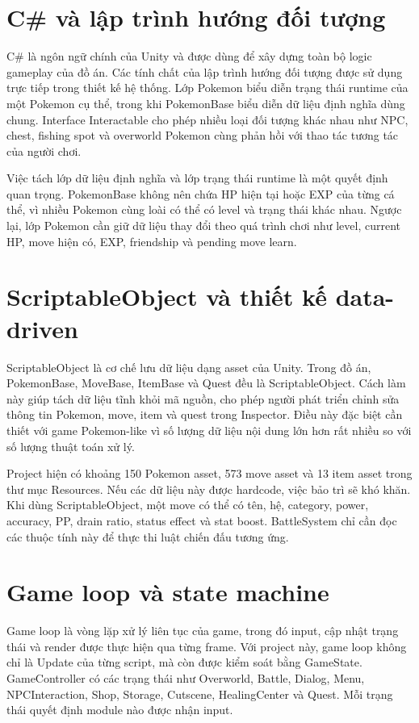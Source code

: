\section{C\# và lập trình hướng đối tượng}

C\# là ngôn ngữ chính của Unity và được dùng để xây dựng toàn bộ logic gameplay của đồ án. Các tính chất của lập trình hướng đối tượng được sử dụng trực tiếp trong thiết kế hệ thống. Lớp Pokemon biểu diễn trạng thái runtime của một Pokemon cụ thể, trong khi PokemonBase biểu diễn dữ liệu định nghĩa dùng chung. Interface Interactable cho phép nhiều loại đối tượng khác nhau như NPC, chest, fishing spot và overworld Pokemon cùng phản hồi với thao tác tương tác của người chơi.

Việc tách lớp dữ liệu định nghĩa và lớp trạng thái runtime là một quyết định quan trọng. PokemonBase không nên chứa HP hiện tại hoặc EXP của từng cá thể, vì nhiều Pokemon cùng loài có thể có level và trạng thái khác nhau. Ngược lại, lớp Pokemon cần giữ dữ liệu thay đổi theo quá trình chơi như level, current HP, move hiện có, EXP, friendship và pending move learn.

\section{ScriptableObject và thiết kế data-driven}

ScriptableObject là cơ chế lưu dữ liệu dạng asset của Unity. Trong đồ án, PokemonBase, MoveBase, ItemBase và Quest đều là ScriptableObject. Cách làm này giúp tách dữ liệu tĩnh khỏi mã nguồn, cho phép người phát triển chỉnh sửa thông tin Pokemon, move, item và quest trong Inspector. Điều này đặc biệt cần thiết với game Pokemon-like vì số lượng dữ liệu nội dung lớn hơn rất nhiều so với số lượng thuật toán xử lý.

Project hiện có khoảng 150 Pokemon asset, 573 move asset và 13 item asset trong thư mục Resources. Nếu các dữ liệu này được hardcode, việc bảo trì sẽ khó khăn. Khi dùng ScriptableObject, một move có thể có tên, hệ, category, power, accuracy, PP, drain ratio, status effect và stat boost. BattleSystem chỉ cần đọc các thuộc tính này để thực thi luật chiến đấu tương ứng.

\section{Game loop và state machine}

Game loop là vòng lặp xử lý liên tục của game, trong đó input, cập nhật trạng thái và render được thực hiện qua từng frame. Với project này, game loop không chỉ là Update của từng script, mà còn được kiểm soát bằng GameState. GameController có các trạng thái như Overworld, Battle, Dialog, Menu, NPCInteraction, Shop, Storage, Cutscene, HealingCenter và Quest. Mỗi trạng thái quyết định module nào được nhận input.

